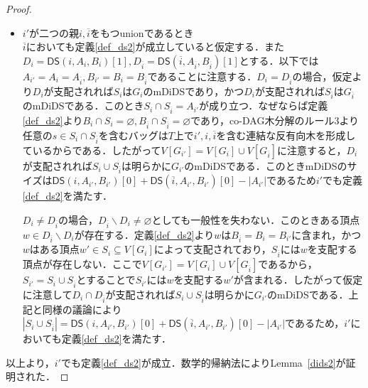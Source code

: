 \documentclass[master]{kuisthesis}		%
\def\|{\verb|}
\theoremstyle{plain}
\theoremstyle{definition}
\begin{document}
{\begin{proof}
\begin{itemize}
        \item $i'$が二つの親$i, \overline{i}$をもつunionであるとき \\
        $\overline{i}$においても定義\ref{def_ds2}が成立していると仮定する．また$D_i = \mathsf{DS}(i, A_i, B_i)[1], D_{\overline{i}} = \mathsf{DS}(\overline{i}, A_{\overline{i}}, B_{\overline{i}})[1]$とする．以下では$A_{i'} = A_{i} = A_{\overline{i}}, B_{i'} = B_{i} = B_{\overline{i}}$であることに注意する．$D_i = D_{\overline{i}}$の場合，仮定より$D_i$が支配されれば$S_i$は$G_i$のmDiDSであり，かつ$D_i$が支配されれば$S_{\overline{i}}$は$G_{\overline{i}}$のmDiDSである．このとき$S_{i} \cap S_{\overline{i}} = A_{i'}$が成り立つ．なぜならば定義\ref{def_ds2}より$B_{i} \cap S_i = \varnothing, B_{\overline{i}} \cap S_{\overline{i}} = \varnothing$であり，co-DAG木分解のルール3より任意の$s \in S_{i} \cap S_{\overline{i}}$を含むバッグは$T$上で$i', i, \overline{i}$を含む連結な反有向木を形成しているからである．したがって$V[G_{i'}] = V[G_i] \cup V[G_{\overline{i}}]$に注意すると，$D_i$が支配されれば$S_i \cup S_{\overline{i}}$は明らかに$G_{i'}$のmDiDSである．このときmDiDSのサイズは$\mathsf{DS}(i, A_{i'}, B_{i'})[0] + \mathsf{DS}(\overline{i}, A_{i'}, B_{i'})[0] - |A_{i'}|$であるため$i'$でも定義\ref{def_ds2}を満たす．

        $D_i \neq D_{\overline{i}}$の場合，$D_{\overline{i}} \backslash D_i \neq \varnothing$としても一般性を失わない．このときある頂点$w \in D_{\overline{i}} \backslash D_i$が存在する．定義\ref{def_ds2}より$w$は$B_{\overline{i}} = B_{i} = B_{i'}$に含まれ，かつ$w$はある頂点$w' \in S_i\subseteq V[G_i]$によって支配されており，$S_{\overline{i}}$には$w$を支配する頂点が存在しない．ここで$V[G_{i'}] = V[G_i] \cup V[G_{\overline{i}}]$であるから，$S_{i'} = S_i \cup S_{\overline{i}}$とすることで$S_{i'}$には$w$を支配する$w'$が含まれる．したがって仮定に注意して$D_i \cap D_{\overline{i}}$が支配されれば$S_i \cup S_{\overline{i}}$は明らかに$G_{i'}$のmDiDSである．上記と同様の議論により$|S_i \cup S_{\overline{i}}| = \mathsf{DS}(i, A_{i'}, B_{i'})[0] + \mathsf{DS}(\overline{i}, A_{i'}, B_{i'})[0] - |A_{i'}|$であるため，$i'$においても定義\ref{def_ds2}を満たす．
        
    \end{itemize}
    以上より，$i'$でも定義\ref{def_ds2}が成立．数学的帰納法によりLemma~\ref{dids2}が証明された．
\end{proof}

}





\end{document}

